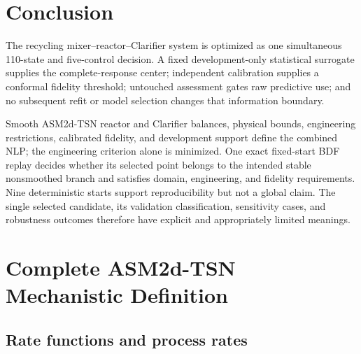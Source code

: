 \documentclass[a4paper,fleqn]{cas-sc}
\begin{document}
\section{Conclusion}

The recycling mixer--reactor--Clarifier system is optimized as one simultaneous 110-state and five-control decision. A fixed development-only statistical surrogate supplies the complete-response center; independent calibration supplies a conformal fidelity threshold; untouched assessment gates raw predictive use; and no subsequent refit or model selection changes that information boundary.

Smooth ASM2d-TSN reactor and Clarifier balances, physical bounds, engineering restrictions, calibrated fidelity, and development support define the combined NLP; the engineering criterion alone is minimized. One exact fixed-start BDF replay decides whether its selected point belongs to the intended stable nonsmoothed branch and satisfies domain, engineering, and fidelity requirements. Nine deterministic starts support reproducibility but not a global claim. The single selected candidate, its validation classification, sensitivity cases, and robustness outcomes therefore have explicit and appropriately limited meanings.

\appendix

\section{Complete ASM2d-TSN Mechanistic Definition}
\label{app:mechanistic_definition}

\subsection{Rate functions and process rates}
\end{document}
